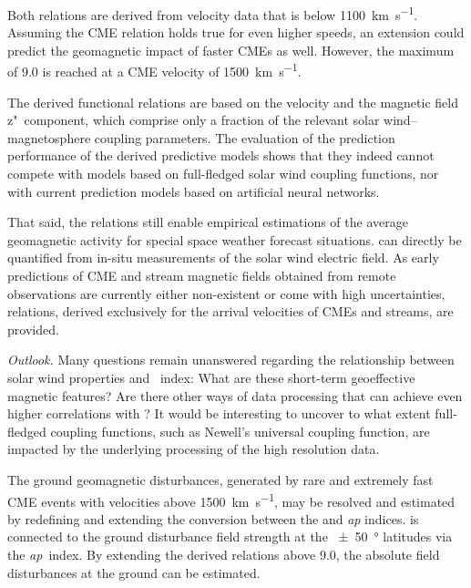Both relations are derived from velocity data that is below \SI{1100}{\km\per\s}. Assuming the CME relation holds true for even higher speeds, an extension could predict the geomagnetic impact of faster CMEs as well. However, the maximum \Kp{} of \num{9.0} is reached at a CME velocity of \SI{1500}{\km\per\s}.

The derived functional relations are based on the velocity and the magnetic field z"~component, which comprise only a fraction of the relevant solar wind--magnetosphere coupling parameters. The evaluation of the prediction performance of the derived predictive models shows that they indeed cannot compete with models based on full-fledged solar wind coupling functions, nor with current prediction models based on artificial neural networks.

That said, the relations still enable empirical estimations of the average geomagnetic activity for special space weather forecast situations. \Kp{} can directly be quantified from in-situ measurements of the solar wind electric field. As early predictions of CME and stream magnetic fields obtained from remote observations are currently either non-existent or come with high uncertainties, \Kp{} relations, derived exclusively for the arrival velocities of CMEs and streams, are provided.

\bigskip

\noindent \textit{Outlook.}
Many questions remain unanswered regarding the relationship between solar wind properties and \Kp~index: What are these short-term geoeffective magnetic features? Are there other ways of data processing that can achieve even higher correlations with \Kp{}?
It would be interesting to uncover to what extent full-fledged coupling functions, such as Newell's universal coupling function, are impacted by the underlying processing of the high resolution data.

The ground geomagnetic disturbances, generated by rare and extremely fast CME events with velocities above \SI{1500}{\km\per\s}, may be resolved and estimated by redefining and extending the conversion between the \Kp{} and \textit{ap} indices. \Kp{} is connected to the ground disturbance field strength at the \SI{+-50}{\degree} latitudes via the \textit{ap}~index. By extending the derived \Kp{} relations above \num{9.0}, the absolute field disturbances at the ground can be estimated.

